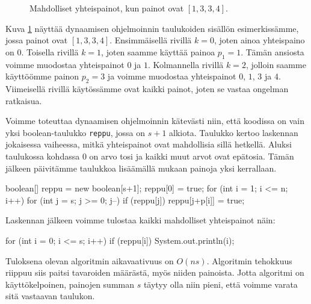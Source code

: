 \begin{figure}
\center
{}
\caption{Mahdolliset yhteispainot, kun painot ovat $[1,3,3,4]$.}
\label{fig:reppak}
\end{figure}

Kuva \ref{fig:reppak} näyttää dynaamisen ohjelmoinnin
taulukoiden sisällön esimerkissämme, jossa painot ovat $[1,3,3,4]$.
Ensimmäisellä rivillä $k=0$, joten ainoa yhteispaino on $0$.
Toisella rivillä $k=1$, joten saamme käyttää painoa $p_1=1$.
Tämän ansiosta voimme muodostaa yhteispainot $0$ ja $1$.
Kolmannella rivillä $k=2$, jolloin saamme käyttöömme painon $p_2=3$
ja voimme muodostaa yhteispainot $0$, $1$, $3$ ja $4$.
Viimeisellä rivillä käytössämme ovat kaikki painot,
joten se vastaa ongelman ratkaisua.

Voimme toteuttaa dynaamisen ohjelmoinnin kätevästi niin,
että koodissa on vain yksi boolean-taulukko \texttt{reppu},
jossa on $s+1$ alkiota.
Taulukko kertoo laskennan jokaisessa vaiheessa,
mitkä yhteispainot ovat mahdollisia sillä hetkellä.
Aluksi taulukossa kohdassa $0$ on arvo tosi ja
kaikki muut arvot ovat epätosia.
Tämän jälkeen päivitämme taulukkoa lisäämällä mukaan
painoja yksi kerrallaan.

\begin{code}
boolean[] reppu = new boolean[s+1];
reppu[0] = true;
for (int i = 1; i <= n; i++) {
    for (int j = s; j >= 0; j--) {
        if (reppu[j]) reppu[j+p[i]] = true;
    }
}
\end{code}

Laskennan jälkeen voimme tulostaa kaikki
mahdolliset yhteispainot näin:

\begin{code}
for (int i = 0; i <= s; i++) {
    if (reppu[i]) {
        System.out.println(i);
    }
}
\end{code}

Tuloksena olevan algoritmin aikavaativuus on $O(ns)$.
Algoritmin tehokkuus riippuu siis paitsi tavaroiden määrästä,
myös niiden painoista.
Jotta algoritmi on käyttökelpoinen, painojen summan $s$
täytyy olla niin pieni, että voimme varata sitä
vastaavan taulukon.

